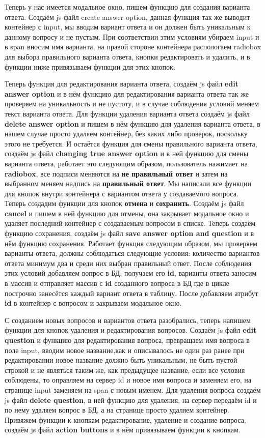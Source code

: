 \documentclass[12pt, oldlfont, amsfonts]{report}
\begin{document}
Теперь у нас имеется модальное окно, пишем функцию для создания варианта ответа. Создаём js файл {create answer option}, данная функция так же выводит контейнер с input, мы вводим вариант ответа и он должен быть уникальным к данному вопросу и не пустым. При соответствии этим условиям убираем input и в span вносим имя варианта, на правой стороне контейнера распологаем radiobox для выбора правильного варианта ответа, кнопки редактировать и удалить, и в функции ниже привязываем функции для этих кнопок.

Теперь функция для редактирования варианта ответа, создаём js файл {\bf edit answer option} и в нём функцию для редактирования варианта ответа так же проверяем на уникальность и не пустоту, и в случае соблюдения условий меняем текст варианта ответа. Для функции удаления варианта ответа создаём js файл {\bf delete answer option} и пишем в нём функцию для удаления варианта ответа, в нашем случае просто удаляем контейнер, без каких либо проверок, поскольку этого не требуется. И остаётся функция для смены правильного варианта ответа, создаём js файл {\bf changing true answer option} и в ней функцию для смены варианта ответа, работает это следующим образом, пользователь нажимает на {\bf radiobox}, все подписи меняются на {\bf не правильный ответ} и затем на выбранном меняем надпись на {\bf правильный ответ}. Мы написали все функции для кнопок внутри контейнера с вариантом ответа у создаваемого вопроса. Теперь создадим функции для кнопок {\bf отмена} и {\bf сохранить}. Создаём js файл {\bf cancel} и пишем в ней функцию для отмены, она закрывает модальное окно и удаляет последний контейнер с создаваемым вопросом в списке. Теперь создаём функцию сохранения, создаём js файл {\bf save answer option and question} и в нём функцию сохранения. Работает функция следующим образом, мы проверяем варианты ответа, должны соблюдаться следующие условия: количество вариантов ответа минимум два и среди них выбран правильный ответ. После соблюдения этих условий добавляем вопрос в БД, получаем его {\bf id}, варианты ответа заносим в массив и отправляет массив с {\bf id} созданного вопроса в БД где в цикле построчно занесётся каждый вариант ответа в таблицу. После добавляем атрибут {\bf id} в контейнер с вопросом и закрываем модальное окно.

С созданием новых вопросов и вариантов ответа разобрались, теперь напишем функции для кнопок удаления и редактирования вопросов. Создаём js файл {\bf edit question} и функцию для редактирования вопроса, превращаем имя вопроса в поле input, вводим новое название,как и описывалось не один раз ранее при редактировании новое название должно быть уникальным, не быть пустой строкой и не являться таким же, как предыдущее название, если все условия соблюдены, то оправляем на сервер id и новое имя вопроса и заменяем его, на странице input заменяем на span с новым именем. Для удаления вопроса создаём js файл {\bf delete question}, в ней функцию для удаления, на сервер передаём id и по нему удаляем вопрос в БД, а на странице просто удаляем контейнер. Привяжем функции к кнопкам редактирование, удаление и создание вопроса, создаём js файл {\bf action buttons} и в нём привязываем функции к кнопкам.
\end{document}
